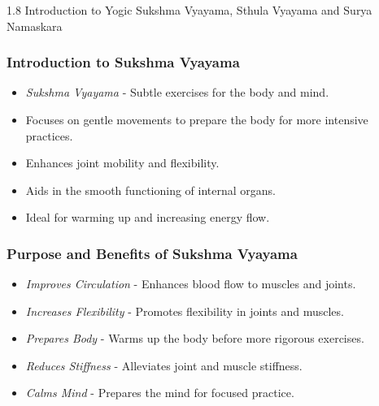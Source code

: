 \begin{frame}[fragile]\frametitle{}
\begin{center}
{\Large 1.8 Introduction to Yogic  Sukshma Vyayama,  Sthula Vyayama and Surya Namaskara}
\end{center}
\end{frame}

\begin{frame}[fragile]\frametitle{Introduction to Sukshma Vyayama}

      \begin{itemize}
		\item \textit{Sukshma Vyayama} - Subtle exercises for the body and mind.
		\item Focuses on gentle movements to prepare the body for more intensive practices.
		\item Enhances joint mobility and flexibility.
		\item Aids in the smooth functioning of internal organs.
		\item Ideal for warming up and increasing energy flow.
	  \end{itemize}

\end{frame}

\begin{frame}[fragile]\frametitle{Purpose and Benefits of Sukshma Vyayama}

      \begin{itemize}
		\item \textit{Improves Circulation} - Enhances blood flow to muscles and joints.
		\item \textit{Increases Flexibility} - Promotes flexibility in joints and muscles.
		\item \textit{Prepares Body} - Warms up the body before more rigorous exercises.
		\item \textit{Reduces Stiffness} - Alleviates joint and muscle stiffness.
		\item \textit{Calms Mind} - Prepares the mind for focused practice.
	  \end{itemize}

\end{frame}

